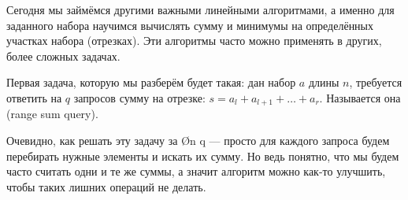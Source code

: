 Сегодня мы займёмся другими важными линейными алгоритмами, а именно для заданного набора научимся вычислять сумму и минимумы на определённых участках набора (отрезках). Эти алгоритмы часто можно применять в других, более сложных задачах.


Первая задача, которую мы разберём будет такая: дан набор $a$ длины $n$, требуется ответить на $q$ запросов сумму на отрезке: $s = a_l + a_{l + 1} + \ldots + a_r$. Называется она  (range sum query).

Очевидно, как решать эту задачу за \O{n \cdot q} — просто для каждого запроса будем перебирать нужные элементы и искать их сумму. Но ведь понятно, что мы будем часто считать одни и те же суммы, а значит алгоритм можно как-то улучшить, чтобы таких лишних операций не делать.

